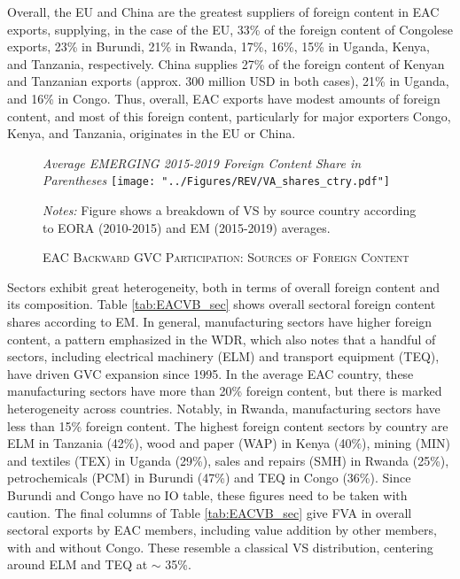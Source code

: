\documentclass[a4paper]{article}
\begin{document}
Overall, the EU and China are the greatest suppliers of foreign content in EAC exports, supplying, in the case of the EU, 33\% of the foreign content of Congolese exports, 23\% in Burundi, 21\% in Rwanda, 17\%, 16\%, 15\% in Uganda, Kenya, and Tanzania, respectively. China supplies 27\% of the foreign content of Kenyan and Tanzanian exports (approx. 300 million USD in both cases), 21\% in Uganda, and 16\% in Congo. Thus, overall, EAC exports have modest amounts of foreign content, and most of this foreign content, particularly for major exporters Congo, Kenya, and Tanzania, originates in the EU or China. 


\begin{figure}[h!]
\centering
\caption{\label{fig:EACVB_ctry}\textsc{EAC Backward GVC Participation: Sources of Foreign Content}}
\small{\textit{Average EMERGING 2015-2019 Foreign Content Share in Parentheses}}
\vspace{2mm}
\texttt{[image: "../Figures/REV/VA\_shares\_ctry.pdf"]} \\ \raggedright
\scriptsize
\vspace{-2mm}
\emph{Notes:} Figure shows a breakdown of VS by source country according to EORA (2010-2015) and EM (2015-2019) averages. \\ \vspace{-2mm}
\end{figure}
\FloatBarrier

Sectors exhibit great heterogeneity, both in terms of overall foreign content and its composition. Table \ref{tab:EACVB_sec} shows overall sectoral foreign content shares according to EM. In general, manufacturing sectors have higher foreign content, a pattern emphasized in the WDR, which also notes that a handful of sectors, including electrical machinery (ELM) and transport equipment (TEQ), have driven GVC expansion since 1995. In the average EAC country, these manufacturing sectors have more than 20\% foreign content, but there is marked heterogeneity across countries. Notably, in Rwanda, manufacturing sectors have less than 15\% foreign content. The highest foreign content sectors by country are ELM in Tanzania (42\%), wood and paper (WAP) in Kenya (40\%), mining (MIN) and textiles (TEX) in Uganda (29\%), sales and repairs (SMH) in Rwanda (25\%), petrochemicals (PCM) in Burundi (47\%) and TEQ in Congo (36\%). Since Burundi and Congo have no IO table, these figures need to be taken with caution. The final columns of Table \ref{tab:EACVB_sec} give FVA in overall sectoral exports by EAC members, including value addition by other members, with and without Congo. These resemble a classical VS distribution, centering around ELM and TEQ at $\sim$ 35\%. 
\end{document}
